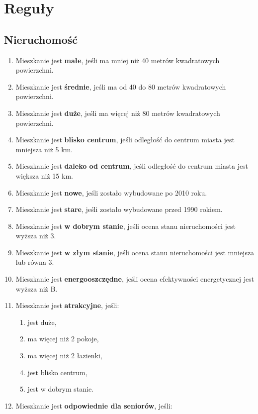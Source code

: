 \section{Reguły}

\subsection{Nieruchomość}
\begin{enumerate}[label=N\arabic*.]
    \item Mieszkanie jest \textbf{małe}, jeśli ma mniej niż 40 metrów kwadratowych powierzchni.
    \item Mieszkanie jest \textbf{średnie}, jeśli ma od 40 do 80 metrów kwadratowych powierzchni.
    \item Mieszkanie jest \textbf{duże}, jeśli ma więcej niż 80 metrów kwadratowych powierzchni.
    \item Mieszkanie jest \textbf{blisko centrum}, jeśli odległość do centrum miasta jest mniejsza niż 5 km.
    \item Mieszkanie jest \textbf{daleko od centrum}, jeśli odległość do centrum miasta jest większa niż 15 km.
    \item Mieszkanie jest \textbf{nowe}, jeśli zostało wybudowane po 2010 roku.
    \item Mieszkanie jest \textbf{stare}, jeśli zostało wybudowane przed 1990 rokiem.
    \item Mieszkanie jest \textbf{w dobrym stanie}, jeśli ocena stanu nieruchomości jest wyższa niż 3.
    \item Mieszkanie jest \textbf{w złym stanie}, jeśli ocena stanu nieruchomości jest mniejsza lub równa 3.
    \item Mieszkanie jest \textbf{energooszczędne}, jeśli ocena efektywności energetycznej jest wyższa niż B.
    \item Mieszkanie jest \textbf{atrakcyjne}, jeśli:
    \begin{enumerate}[label=\arabic*.]
        \item jest duże,
        \item ma więcej niż 2 pokoje,
        \item ma więcej niż 2 łazienki,
        \item jest blisko centrum,
        \item jest w dobrym stanie.
    \end{enumerate}
    \item Mieszkanie jest \textbf{odpowiednie dla seniorów}, jeśli:

\end{enumerate}
